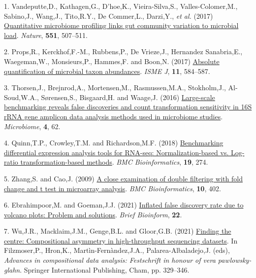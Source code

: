 \documentclass[
]{article}
\newlength{\cslhangindent}
\newenvironment{CSLReferences}[2] %
 {\begin{list}{}{%
  \setlength{\itemindent}{0pt}
  \setlength{\leftmargin}{0pt}
  \setlength{\parsep}{0pt}
  \ifodd #1
   \setlength{\leftmargin}{\cslhangindent}
   \setlength{\itemindent}{-1\cslhangindent}
  \fi
  \setlength{\itemsep}{#2\baselineskip}}}
 {\end{list}}
\begin{document}
\label{refs}
\begin{CSLReferences}{1}{1}
1. Vandeputte,D., Kathagen,G., D'hoe,K., Vieira-Silva,S.,
Valles-Colomer,M., Sabino,J., Wang,J., Tito,R.Y., De Commer,L.,
Darzi,Y., \emph{et al.} (2017)
\href{https://doi.org/10.1038/nature24460}{Quantitative microbiome
profiling links gut community variation to microbial load}.
\emph{Nature}, \textbf{551}, 507--511.

2. Props,R., Kerckhof,F.-M., Rubbens,P., De Vrieze,J., Hernandez
Sanabria,E., Waegeman,W., Monsieurs,P., Hammes,F. and Boon,N. (2017)
\href{https://doi.org/10.1038/ismej.2016.117}{Absolute quantification of
microbial taxon abundances}. \emph{ISME J}, \textbf{11}, 584--587.

3. Thorsen,J., Brejnrod,A., Mortensen,M., Rasmussen,M.A., Stokholm,J.,
Al-Soud,W.A., Sørensen,S., Bisgaard,H. and Waage,J. (2016)
\href{https://doi.org/10.1186/s40168-016-0208-8}{Large-scale
benchmarking reveals false discoveries and count transformation
sensitivity in 16{S} r{RNA} gene amplicon data analysis methods used in
microbiome studies}. \emph{Microbiome}, \textbf{4}, 62.

4. Quinn,T.P., Crowley,T.M. and Richardson,M.F. (2018)
\href{https://doi.org/10.1186/s12859-018-2261-8}{Benchmarking
differential expression analysis tools for RNA-seq: Normalization-based
vs. Log-ratio transformation-based methods}. \emph{BMC Bioinformatics},
\textbf{19}, 274.

5. Zhang,S. and Cao,J. (2009)
\href{https://doi.org/10.1186/1471-2105-10-402}{A close examination of
double filtering with fold change and t test in microarray analysis}.
\emph{BMC Bioinformatics}, \textbf{10}, 402.

6. Ebrahimpoor,M. and Goeman,J.J. (2021)
\href{https://doi.org/10.1093/bib/bbab053}{Inflated false discovery rate
due to volcano plots: Problem and solutions}. \emph{Brief Bioinform},
\textbf{22}.

7. Wu,J.R., Macklaim,J.M., Genge,B.L. and Gloor,G.B. (2021)
\href{https://doi.org/10.1007/978-3-030-71175-7_17}{Finding the centre:
Compositional asymmetry in high-throughput sequencing datasets}. In
Filzmoser,P., Hron,K., Martìn-Fernàndez,J.A., Palarea-Albaladejo,J.
(eds), \emph{Advances in compositional data analysis: Festschrift in
honour of vera pawlowsky-glahn}. Springer International Publishing,
Cham, pp. 329--346.


\end{CSLReferences}
\end{document}
